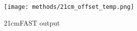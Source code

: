 \lipsum[2-6]

\begin{figure}[th]
	\centering
	\texttt{[image: methods/21cm\_offset\_temp.png]}
	\caption[21cmFAST output]{21cmFAST output}
	\label{fig:21cm_offset_temp}
\end{figure}
